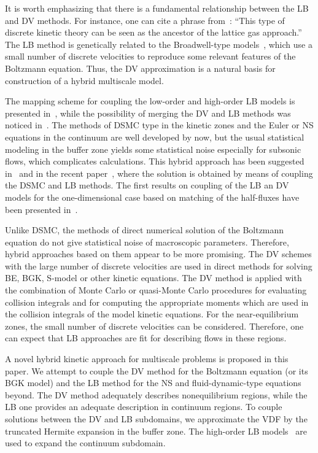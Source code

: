 \documentclass{elsarticle} %
\begin{document}
It is worth emphasizing that there is a fundamental relationship between the LB and DV methods.
For instance, one can cite a phrase from~\cite{Rivet2001}:
``This type of discrete kinetic theory can be seen as the ancestor of the lattice gas approach.''
The LB method is genetically related to the Broadwell-type models~\cite{Broadwell1964shock, Gatignol1975},
which use a small number of discrete velocities to reproduce some relevant features of the Boltzmann equation.
Thus, the DV approximation is a natural basis for construction of a hybrid multiscale model.

The mapping scheme for coupling the low-order and high-order LB models is presented in~\cite{Meng2011},
while the possibility of merging the DV and LB methods was noticed in~\cite{Succi2016}.
The methods of DSMC type in the kinetic zones and the Euler or NS equations in the continuum are well developed by now,
but the usual statistical modeling in the buffer zone yields some statistical noise especially for subsonic flows,
which complicates calculations.
This hybrid approach has been suggested in~\cite{Staso2016short, Staso2016long} and in the recent paper~\cite{Staso2018},
where the solution is obtained by means of coupling the DSMC and LB methods.
The first results on coupling of the LB an DV models for the one-dimensional case
based on matching of the half-fluxes have been presented in~\cite{Ilyin2018}.

Unlike DSMC, the methods of direct numerical solution of the Boltzmann equation do not give statistical noise of macroscopic parameters.
Therefore, hybrid approaches based on them appear to be more promising.
The DV schemes with the large number of discrete velocities are used in direct methods for solving BE, BGK, S-model or other kinetic equations.
The DV method is applied with the combination of Monte Carlo or quasi-Monte Carlo procedures for evaluating collision integrals
and for computing the appropriate moments which are used in the collision integrals of the model kinetic equations.
For the near-equilibrium zones, the small number of discrete velocities can be considered.
Therefore, one can expect that LB approaches are fit for describing flows in these regions.

A novel hybrid kinetic approach for multiscale problems is proposed in this paper.
We attempt to couple the DV method for the Boltzmann equation (or its BGK model)
and the LB method for the NS and fluid-dynamic-type equations beyond.
The DV method adequately describes nonequilibrium regions, while the LB one provides an adequate description in continuum regions.
To couple solutions between the DV and LB subdomains, we approximate the VDF by the truncated Hermite expansion in the buffer zone.
The high-order LB models~\cite{Shan2006, Feuchter2016}
are used to expand the continuum subdomain.
\end{document}
